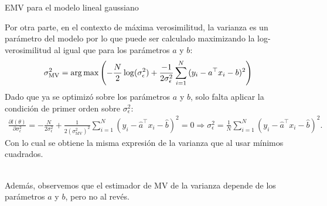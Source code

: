 \documentclass[9pt]{beamer}
\begin{document}
\begin{frame}{EMV para el modelo lineal gaussiano}
	
Por otra parte, en el contexto de máxima verosimilitud, la varianza es un parámetro del modelo por lo que puede ser calculado maximizando la log-verosimilitud al igual que para los parámetros $a$ y $b$:
\begin{align*}
	\sigma^2_{\text{MV}} &= \operatorname*{arg\,max} \left(-\frac{N}{2} \log(\sigma_\epsilon^{2}) + \frac{-1}{2\sigma_\epsilon^2}\sum_{i=1}^N {(y_i-a^\top x_i -b)^2}\right) 
\end{align*}
Dado que ya se optimizó sobre los parámetros $a$ y $b$, solo falta aplicar  la condición de primer orden sobre $\sigma_\epsilon^2$:
\begin{align*}
	\frac{\partial l(\theta)}{\partial \sigma_\epsilon^2} = -\frac{N}{2\sigma_\epsilon^2} + \frac{1}{2(\sigma^2_{\text{MV}})^2}\sum_{i=1}^N {(y_i-\hat{a}^\top x_i -\hat{b})^2} = 0 \Rightarrow \sigma_\epsilon^2 = \frac{1}{N}\sum_{i=1}^N {(y_i-\hat{a}^\top x_i -\hat{b})^2}.
\end{align*}
Con lo cual se obtiene la misma expresión de la varianza que al usar mínimos cuadrados. \\~\

Además, observemos que el estimador de MV de la varianza depende de los parámetros $a$ y $b$, pero no al revés.
	
\end{frame}
\end{document}
